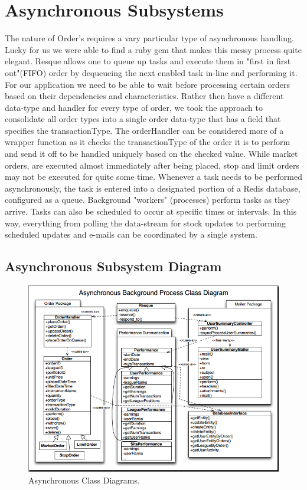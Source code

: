 \section{Asynchronous Subsystems}
The nature of Order's requires a vary particular type of asynchronous handling.  Lucky for us we were able to find a ruby gem that makes this messy process quite elegant.  Resque allows one to queue up tasks and execute them in "first in first out"(FIFO) order by dequeueing the next enabled task in-line and performing it.  For our application we need to be able to wait before processing certain orders based on their dependencies and characteristics.  Rather then have a different data-type and handler for every type of order, we took the approach to consolidate all order types into a single order data-type that has a field that specifies the transactionType.  The orderHandler can be considered more of a wrapper function as it checks the transactionType of the order it is to perform and send it off to be handled uniquely based on the checked value.  While market orders, are executed almost immediately after being placed, stop and limit orders may not be executed for quite some time.  Whenever a task needs to be performed asynchronously, the task is entered into a designated portion of a Redis database, configured as a queue. Background "workers" (processes) perform tasks as they arrive. Tasks can also be scheduled to occur at specific times or intervals. In this way, everything from polling the data-stream for stock updates to performing scheduled updates and e-mails can be coordinated by a single system.


\subsection{Asynchronous Subsystem Diagram}
\begin{figure}[b]
\centering
\includegraphics[width=5in]{./Diagrams/ClassDiagrams/cd2.png}
\caption{ Asynchronous Class Diagrams.}
\end{figure}


